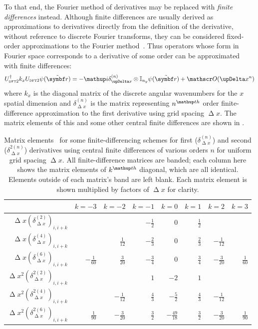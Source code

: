 To that end, the Fourier method of derivatives may be replaced with \emph{finite differences} instead. Although finite differences are usually derived as approximations to derivatives directly from the definition of the derivative, without reference to discrete Fourier transforms, they can be considered fixed-order approximations to the Fourier method~\cite{fornberg_pseudospectral_1987}. Thus operators whose form in Fourier space corresponds to a derivative of some order can be approximated with finite differences:
\begin{align}
U^\dagger_{\textsc{dft2}} k_x U_{\textsc{dft2}}\psi(\tilde{\vec r}) = 
-\ii\delta^{(n)}_{\upDelta x} \otimes \mathbb{I}_{n_y}\psi(\tilde{\vec r}) + \Ord{\upDelta x^n}
\end{align} 
where $k_x$ is the diagonal matrix of the discrete angular wavenumbers for the $x$ spatial dimension and $\delta^{(n)}_{\upDelta x}$ is the matrix representing $n^\up{th}$ order finite-difference approximation to the first derivative using grid spacing $\upDelta x$. The matrix elements of this and some other central finite differences are shown in .

\begin{table}
\centering
\renewcommand{\arraystretch}{1.5}
\setlength\heavyrulewidth{1.5pt}
\begin{tabular}[c]{rrrrrrrr}
\toprule
 & $k=-3$ & $k=-2$ & $k=-1$ & $k=0$ & $k=1$ & $k=2$ & $k=3$\\
\midrule
$\upDelta x\left(\delta^{(2)}_{\upDelta x}\right)_{i, i+k}$ 
& & & $-\frac{1}{2}$ & $0$ & $\frac{1}{2}$ & & \\
$\upDelta x\left(\delta^{(4)}_{\upDelta x}\right)_{i, i+k}$ 
& & $\frac{1}{12}$ & $-\frac{2}{3}$ & $0$ & $\frac{2}{3}$ & $-\frac{1}{12}$ & \\
$\upDelta x\left(\delta^{(6)}_{\upDelta x}\right)_{i, i+k}$ 
& $-\frac{1}{60}$ & $\frac{3}{20}$ & $-\frac{3}{4}$ & $0$ & $\frac{3}{4}$ & $-\frac{3}{20}$ & $\frac{1}{60}$\\
$\upDelta x^2\left(\delta^{2 (2)}_{\upDelta x}\right)_{i, i+k}$ 
& & & $1$ & $-2$ & $1$ & & \\
$\upDelta x^2\left(\delta^{2 (4)}_{\upDelta x}\right)_{i, i+k}$ 
& & $-\frac{1}{12}$ & $\frac{4}{3}$ & $-\frac{5}{2}$ & $\frac{4}{3}$ & $-\frac{1}{12}$ & \\
$\upDelta x^2\left(\delta^{2 (6)}_{\upDelta x}\right)_{i, i+k}$ 
& $\frac{1}{90}$ & $-\frac{3}{20}$ & $\frac{3}{2}$ & $-\frac{49}{18}$ & $\frac{3}{2}$ & $-\frac{3}{20}$ & $\frac{1}{90}$\\
\bottomrule
\end{tabular}
\caption{Matrix elements~\cite{fornberg_generation_1988} for some finite-differencing schemes for first ($\delta^{(n)}_{\upDelta x}$) and second ($\delta^{2 (n)}_{\upDelta x}$) derivatives using central finite differences of various orders $n$ for uniform grid spacing $\upDelta x$. All finite-difference matrices are banded; each column here shows the matrix elements of $k^\up{th}$ diagonal, which are all identical. Elements outside of each matrix's band are left blank. Each matrix element is shown multiplied by factors of $\upDelta x$ for clarity.}\label{table:fd_matrixels}
\end{table}

